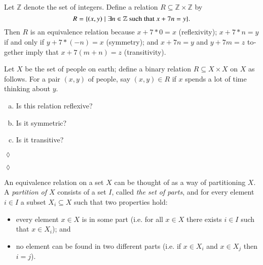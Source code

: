 \documentclass[a4paper]{book}
\def\tn{\textnormal}
\def\ZZ{{\mathbb Z}}
\def\ss{\subseteq}
\def\|{{\;|\;}}
\theoremstyle{myth}
\newtheorem{exampleENG}[envENG]{\begin{english}Example\end{english}}
\newtheorem{excENG}[envENG]{\begin{english}Exercise\end{english}}
\newenvironment{exerciseENG}{\begin{excENG}}{\hspace*{\fill}$\lozenge$\end{excENG}}
\newtheorem{exampleRUS}[envRUS]{\begin{russian}Пример\end{russian}}
\newtheorem{excRUS}[envRUS]{\begin{russian}Упражнение\end{russian}}
\newtheorem{definitionRUS}[envRUS]{\begin{russian}Определение\end{russian}}
\newenvironment{exerciseRUS}{\begin{excRUS}}{\hspace*{\fill}$\lozenge$\end{excRUS}}
\def\sexc{\begin{enumerate}[a.)]\setlength{\itemsep}{.1cm}\setlength{\parskip}{.1cm}\item}
\def\next{\item}
\def\endsexc{\end{enumerate}}
\begin{document}
\begin{english}
\begin{definitionRUS}
\begin{russian} \end{russian}
\end{definitionRUS}

\begin{exampleENG}
Let $\ZZ$ denote the set of integers. Define a relation $R\ss\ZZ\times\ZZ$ by $$R=\{(x,y)\|\exists n\in\ZZ \tn{ such that } x+7n=y\}.$$ Then $R$ is an equivalence relation because $x+7*0=x$ (reflexivity); $x+7*n=y$ if and only if $y+7*(-n)= x$ (symmetry); and $x+7n=y$ and $y+7m=z$ together imply that $x+7(m+n)=z$ (transitivity).
\end{exampleENG}

\begin{exampleRUS}
\begin{russian} \end{russian}
\end{exampleRUS}

\begin{exerciseENG}
Let $X$ be the set of people on earth; define a binary relation $R\ss X\times X$ on $X$ as follows. For a pair $(x,y)$ of people, say $(x,y)\in R$ if $x$ spends a lot of time thinking about $y$. 
\sexc Is this relation reflexive? 
\next Is it symmetric? 
\next Is it transitive?
\endsexc
\end{exerciseENG}

\begin{exerciseRUS}
\begin{russian} \end{russian}
\end{exerciseRUS}

\begin{exampleENG}[Partitions]\label{ex:partition}
An equivalence relation on a set $X$ can be thought of as a way of partitioning $X$. A {\em partition of $X$} consists of a set $I$, called {\em the set of parts}, and for every element $i\in I$ a subset $X_i\ss X$ such that two properties hold:
\begin{itemize}
\item every element $x\in X$ is in some part (i.e. for all $x\in X$ there exists $i\in I$ such that $x\in X_i$); and
\item no element can be found in two different parts (i.e. if $x\in X_i$ and $x\in X_j$ then $i=j$).
\end{itemize}


\end{exampleENG}
\end{english}
\end{document}
